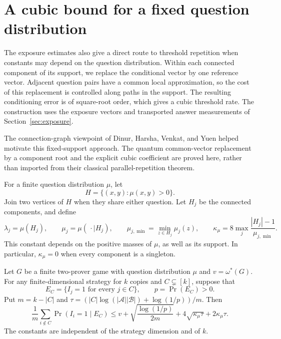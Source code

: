 \section{A cubic bound for a fixed question distribution}
\label{app:root-rounding}

The exposure estimates also give a direct route to threshold repetition
when constants may depend on the question distribution. Within each
connected component of its support, we replace the conditional vector by
one reference vector. Adjacent question pairs have a common local
approximation, so the cost of this replacement is controlled along paths
in the support. The resulting conditioning error is of square-root order,
which gives a cubic threshold rate. The construction uses the exposure
vectors and transported answer measurements of Section~\ref{sec:exposure}.

The connection-graph viewpoint of Dinur, Harsha, Venkat, and Yuen
\cite{dhvy2017} helped motivate this fixed-support approach. The
quantum common-vector replacement by a component root and the explicit
cubic coefficient are proved here, rather than imported from their
classical parallel-repetition theorem.

For a finite question distribution $\mu$, let
\[
 H=\{(x,y):\mu(x,y)>0\}.
\]
Join two vertices of $H$ when they share either question. Let $H_j$ be
the connected components, and define
\begin{equation}\label{eq:root-support-constant}
 \lambda_j=\mu(H_j),\qquad
 \mu_j=\mu(\,\cdot\mid H_j),\qquad
 \mu_{j,\min}=\min_{z\in H_j}\mu_j(z),\qquad
 \kappa_\mu=8\max_j\frac{|H_j|-1}{\mu_{j,\min}}.
\end{equation}
This constant depends on the positive masses of $\mu$, as well as its
support. In particular, $\kappa_\mu=0$ when every component is a singleton.

\begin{proposition}
\label{prop:root-conditioning}
Let $G$ be a finite two-prover game with question distribution $\mu$ and
$v=\omega^*(G)$. For any finite-dimensional strategy for $k$ copies and
$C\subsetneq[k]$, suppose that
\[
 E_C=\{I_j=1\text{ for every }j\in C\},\qquad p=\Pr(E_C)>0.
\]
Put $m=k-|C|$ and
$\tau=(|C|\log(|\mathcal A||\mathcal B|)+\log(1/p))/m$.
Then
\begin{equation}\label{eq:root-conditioning}
 \frac1m\sum_{i\notin C}\Pr(I_i=1\mid E_C)
 \le v+\sqrt{\frac{\log(1/p)}{2m}}
          +4\sqrt{\kappa_\mu\tau}+2\kappa_\mu\tau.
\end{equation}
The constants are independent of the strategy dimension and of $k$.
\end{proposition}

